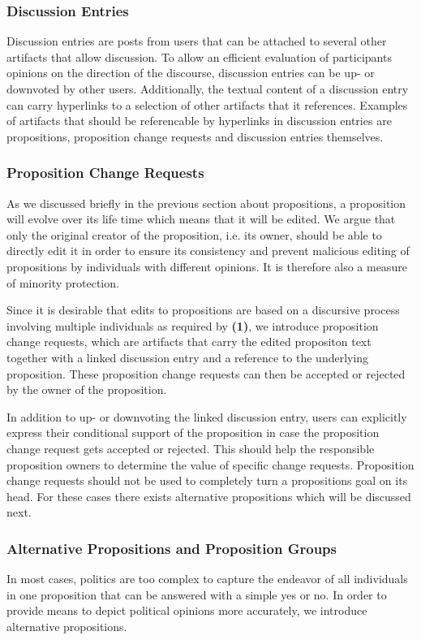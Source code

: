 \subsubsection{Discussion Entries}
\label{ssec:Discussion_Entries}
Discussion entries are posts from users that can be attached to several other artifacts that allow discussion.
To allow an efficient evaluation of participants opinions on the direction of the discourse, discussion entries can be up- or downvoted by other users.
Additionally, the textual content of a discussion entry can carry hyperlinks to a selection of other artifacts that it references.
Examples of artifacts that should be referencable by hyperlinks in discussion entries are propositions, proposition change requests and discussion entries themselves.

\subsubsection{Proposition Change Requests}
\label{ssec:Proposition_Change_Requests}
As we discussed briefly in the previous section about propositions, a proposition will evolve over its life time which means that it will be edited.
We argue that only the original creator of the proposition, i.e. its owner, should be able to directly edit it in order to ensure its consistency and prevent malicious editing of propositions by individuals with different opinions.
It is therefore also a measure of minority protection.

Since it is desirable that edits to propositions are based on a discursive process involving multiple individuals as required by \textbf{(1)}, we introduce proposition change requests, which are artifacts that carry the edited propositon text together with a linked discussion entry and a reference to the underlying proposition. 
These proposition change requests can then be accepted or rejected by the owner of the proposition.

In addition to up- or downvoting the linked discussion entry, users can explicitly express their conditional support of the proposition in case the proposition change request gets accepted or rejected.
This should help the responsible proposition owners to determine the value of specific change requests.
Proposition change requests should not be used to completely turn a propositions goal on its head.
For these cases there exists alternative propositions which will be discussed next.

\subsubsection{Alternative Propositions and Proposition Groups}
\label{ssec:AltProposition}
In most cases, politics are too complex to capture the endeavor of all individuals in one proposition that can be answered with a simple yes or no.
In order to provide means to depict political opinions more accurately, we introduce alternative propositions.


